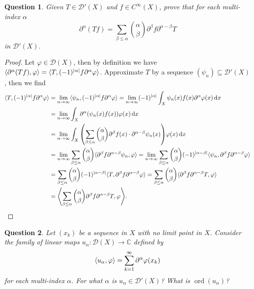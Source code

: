 \documentclass{article}
\theoremstyle{plain}
\newtheorem{question}{Question}
\theoremstyle{remark}
\renewcommand{\phi}{\varphi}
\newcommand{\Bb}{\mathbb}
\newcommand{\Cal}{\mathcal}
\newcommand{\CC}{\Bb C}
\newcommand{\DD}{\Cal D}
\DeclarePairedDelimiter{\ang}{\langle}{\rangle}
\newcommand\pt\partial
\DeclareMathOperator{\ord}{ord}
\begin{document}
\begin{question}
	Given $T \in \DD'(X)$ and $f \in C^\infty(X)$, prove that for each multi-index $\alpha$
	\[
	\pt^\alpha(Tf) = \sum_{\beta \leq \alpha} \binom{\alpha}{\beta} \pt^\beta f \pt^{\alpha - \beta}T
	\]
	in $\DD'(X)$. 
\end{question}

\begin{proof}
	Let $\phi \in \DD(X)$, then by definition we have $\ang{\pt^\alpha(Tf), \phi} = \ang{T, (-1)^\abs{\alpha} f \pt^\alpha\phi}$. Approximate $T$ by a sequence $(\psi_n) \subseteq \DD'(X)$, then we find
	\begin{align*}
	\ang{T, (-1)^{\abs{\alpha}} f \pt^\alpha\phi} &= \lim_{n\to\infty} \ang{\psi_n,  (-1)^{\abs{\alpha}} f \pt^\alpha\phi} = \lim_{n\to\infty}  (-1)^{\abs{\alpha}} \int_X \psi_n(x) f(x) \pt^\alpha\phi(x) \dd{x} \\
	&= \lim_{n\to\infty} \int_X \pt^\alpha (\psi_n(x) f(x)) \phi(x) \dd{x} \\
	&= \lim_{n\to\infty} \int_X \qty(\sum_{\beta \leq \alpha} \binom\alpha\beta\pt^\beta f(x) \cdot \pt^{\alpha - \beta} \psi_n(x)) \phi(x) \dd{x} \\
	&= \lim_{n\to\infty} \sum_{\beta \leq \alpha} \binom\alpha\beta \ang{\pt^\beta f \pt^{\alpha - \beta} \psi_n, \phi} =  \lim_{n\to\infty} \sum_{\beta \leq \alpha} \binom\alpha\beta (-1)^{\abs{\alpha - \beta}} \ang{\psi_n, \pt^\beta f \pt^{\alpha - \beta} \phi} \\
	&= \sum_{\beta \leq \alpha} \binom\alpha\beta (-1)^{\abs{\alpha - \beta}} \ang{T, \pt^\beta f \pt^{\alpha - \beta} \phi} = \sum_{\beta \leq \alpha} \binom\alpha\beta \ang{\pt^\beta f \pt^{\alpha - \beta} T, \phi} \\
	&= \ang*{\sum_{\beta \leq \alpha} \binom{\alpha}{\beta} \pt^\beta f \pt^{\alpha - \beta}T, \phi}. 
	\end{align*}
\end{proof}

\begin{question}
	Let $(x_k)$ be a sequence in $X$ with no limit point in $X$. Consider the family of linear maps
	$u_\alpha \colon \DD(X) \to \CC$ defined by 
	\[ \ang{u_\alpha, \phi} = \sum_{k=1}^\infty \pt^\alpha \phi(x_k)
	 \]
	 for each multi-index $\alpha$. For what $\alpha$ is $u_\alpha \in \DD'(X)$? What is $\ord(u_\alpha)$? 
\end{question}
\end{document}
